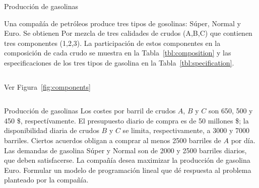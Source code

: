 \documentclass[../../main.tex]{subfiles}
\begin{document}
\begin{frame}{Producción de gasolinas}{}

Una compañía de petróleos produce tres tipos de gosolinas: Súper, Normal y Euro. Se obtienen Por mezcla de tres calidades de crudos (A,B,C) que contienen tres componentes (1,2,3). La participación de estos componentes en la composición de cada crudo se muestra en la Tabla~\ref{tbl:composition} y las especificaciones de los tres tipos de gasolina en la Tabla~\ref{tbl:specification}.%


    \begin{columns}[t]
       \justifying     
      \begin{table}[!ht]
        \caption{\label{tbl:composition}Composición (\%) de cada crudo.}
    \centering
    \end{table}
    
    \begin{table}[!ht]
      \caption{\label{tbl:specification}Especificaciones (\%)}
    \centering
    \end{table}

    Ver Figura~\ref{fig:components}
    \end{columns}
 \end{frame}
  
\begin{frame}{Producción de gasolinas}
    Los costes por barril de crudos $A$, $B$ y $C$ son 650, 500 y 450 \$, respectívamente. El presupuesto diario de compra es de 50 millones \$; la disponibilidad diaria de crudos $B$ y $C$ se limita, respectivamente, a 3000 y 7000 barriles. Ciertos acuerdos obligan a comprar al menos 2500 barriles de $A$ por día. Las demandas de gasolina Súper y Normal son de 2000 y 2500 barriles diarios, que deben satisfacerse. La compañía desea maximizar la producción de gasolina Euro. Formular un modelo de programación lineal que dé respuesta al problema planteado por la compañía.%
  \end{frame}
    
\end{document}
